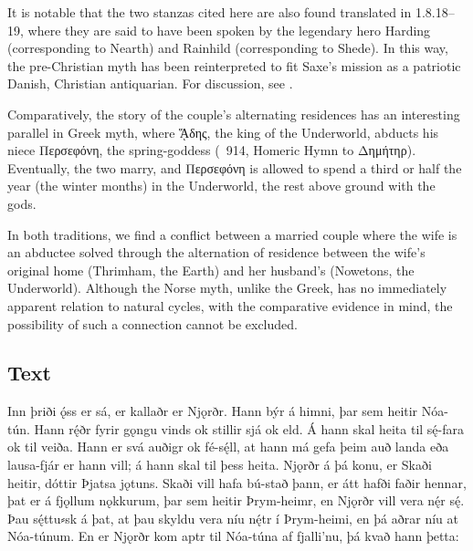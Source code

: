It is notable that the two stanzas cited here are also found translated in \textcite{Saxo2015} 1.8.18--19, where they are said to have been spoken by the legendary hero Harding (corresponding to Nearth) and Rainhild (corresponding to Shede).  In this way, the pre-Christian myth has been reinterpreted to fit Saxe’s mission as a patriotic Danish, Christian antiquarian.  For discussion, see \textcite{Hopkins2021}.

Comparatively, the story of the couple’s alternating residences has an interesting parallel in Greek myth, where \textgreek{ᾍδης}, the king of the Underworld, abducts his niece \textgreek{Περσεφόνη}, the spring-goddess (\Theogony\ 914, Homeric Hymn to \textgreek{Δημήτηρ}).  Eventually, the two marry, and \textgreek{Περσεφόνη} is allowed to spend a third or half the year (the winter months) in the Underworld, the rest above ground with the gods.

In both traditions, we find a conflict between a married couple where the wife is an abductee solved through the alternation of residence between the wife’s original home (Thrimham, the Earth) and her husband’s (Nowetons, the Underworld).
Although the Norse myth, unlike the Greek, has no immediately apparent relation to natural cycles, with the comparative evidence in mind, the possibility of such a connection cannot be excluded.

\subsection{Text}

\bpg\bpa[0]%
%
\pva Inn þriði ǫ́ss er sá, er kallaðr er Njǫrðr.
\pva Hann býr á himni, þar sem heitir Nóa-tún.
\pva Hann rę́ðr fyrir gǫngu vinds ok stillir sjá ok eld.
\pva Á hann skal heita til sę́-fara ok til veiða.
\pva Hann er svá auðigr ok fé-sę́ll, at hann má gefa þeim auð landa eða lausa-fjár er hann vill; á hann skal til þess heita.
\pva {}
\pva Njǫrðr á þá konu, er Skaði heitir, dóttir Þjatsa jǫtuns.
\pva Skaði vill hafa bú-stað þann, er átt hafði faðir hennar, þat er á fjǫllum nǫkkurum, þar sem heitir Þrym-heimr, en Njǫrðr vill vera nę́r sę́.
\pva Þau sę́ttu⸗sk á þat, at þau skyldu vera níu nę́tr í Þrym-heimi, en þá aðrar níu at Nóa-túnum.
\pva En er Njǫrðr kom aptr til Nóa-túna af fjalli’nu, þá kvað hann þetta:\epa


